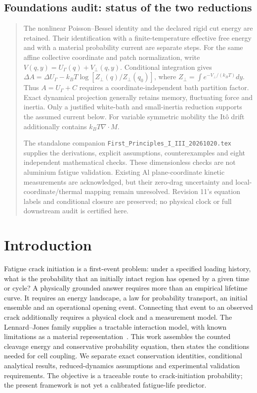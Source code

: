 \documentclass[11pt]{article}
\begin{document}
\subsection*{Foundations audit: status of the two reductions}
\begin{quote}\small
The nonlinear Poisson--Bessel identity and the declared rigid cut energy
are retained. Their identification with a finite-temperature effective
free energy and with a material probability current are separate steps.
For the same affine collective coordinate and patch normalization, write
$V(q,y)=U_\Gamma(q)+V_\perp(q,y)$. Conditional integration gives
$\Delta A=\Delta U_\Gamma-k_BT\log[Z_\perp(q)/Z_\perp(q_0)]$,
where $Z_\perp=\int e^{-V_\perp/(k_BT)}dy$.
Thus $A=U_\Gamma+C$ requires a coordinate-independent bath partition
factor. Exact dynamical projection generally retains memory, fluctuating
force and inertia. Only a justified white-bath and small-inertia reduction
supports the assumed current below. For variable symmetric mobility the
It\^o drift additionally contains $k_BT\nabla\!\cdot M$.

The standalone companion
\texttt{First\_Principles\_I\_III\_20261020.tex} supplies the derivations,
explicit assumptions, counterexamples and eight independent mathematical
checks. These dimensionless checks are not aluminium fatigue validation.
Existing Al plane-coordinate kinetic measurements are acknowledged, but
their zero-drag uncertainty and local-coordinate/thermal mapping remain
unresolved. Revision 11's equation labels and conditional closure are
preserved; no physical clock or full downstream audit is certified here.
\end{quote}

\section{Introduction}
Fatigue crack initiation is a first-event problem: under a specified loading
history, what is the probability that an initially intact region has opened
by a given time or cycle? A physically grounded answer requires more than
an empirical lifetime curve. It requires an energy landscape, a law for
probability transport, an initial ensemble and an operational opening event.
Connecting that event to an observed crack additionally requires a physical
clock and a measurement model.
The Lennard--Jones family supplies a tractable interaction model, with known
limitations as a material representation~\cite{SchwerdtfegerWales2024}.
This work assembles the counted cleavage energy and conservative
probability equation, then states the conditions needed for cell coupling.
We separate exact conservation identities, conditional analytical results,
reduced-dynamics assumptions and experimental validation requirements.
The objective is a traceable route to crack-initiation probability;
the present framework is not yet a calibrated fatigue-life predictor.
\end{document}
